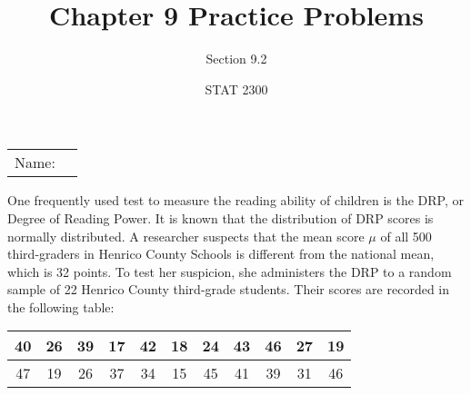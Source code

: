 \documentclass[noanswers]{exam}
\title{Chapter 9 Practice Problems}
\author{Section 9.2}
\date{STAT 2300}
\begin{document}
\noindent\begin{tabular}{@{}p{.3in}p{3in}@{}}
Name: & \hrulefill
\end{tabular}

\vspace{4mm}

\noindent One frequently used test to measure the reading ability of children is the DRP, or Degree of Reading Power. It is known that the distribution of DRP scores is normally distributed. A researcher suspects that the mean score $\mu$ of all 500 third-graders in Henrico County Schools is different from the national mean, which is 32 points. To test her suspicion, she administers the DRP to a random sample of 22 Henrico County third-grade students. Their scores are recorded in the following table:
    \begin{center}
    \begin{tabular}{|c|c|c|c|c|c|c|c|c|c|c|}
    \hline
        40 & 26 & 39 & 17 & 42 & 18 & 24 & 43 & 46 & 27 & 19 \\
        \hline
        47 & 19 & 26 & 37 & 34 & 15 & 45 & 41 & 39 & 31 & 46 \\
        \hline
    \end{tabular}
    \end{center}
\end{document}
